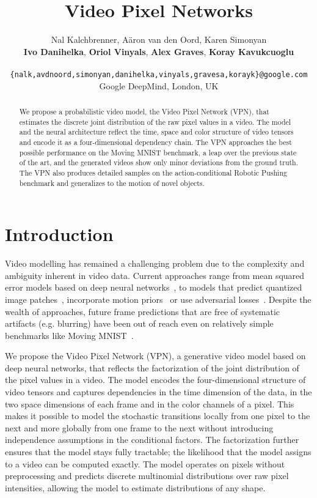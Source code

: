 \documentclass{article}
\title{Video Pixel Networks}
\author{
  {Nal Kalchbrenner},
  {A\"aron van den Oord},
  {Karen Simonyan} \vspace{0.08cm} \\ 
  \hspace{0.02cm} \textbf{Ivo Danihelka},
  \textbf{Oriol Vinyals},
  \textbf{Alex Graves},
  \textbf{Koray Kavukcuoglu} \\ \\ 
 \hspace{0.02cm} \texttt{\{nalk,avdnoord,simonyan,danihelka,vinyals,gravesa,korayk\}@google.com} \vspace{0.08cm}  \\
 \hspace{0.02cm} Google DeepMind, London, UK
}
\begin{document}
\maketitle

\begin{abstract}

We propose a probabilistic video model, the Video Pixel Network (VPN), that estimates the discrete joint distribution of the raw pixel values in a video. The model and the neural architecture reflect  the time, space and color structure of video tensors and encode it as a four-dimensional dependency chain. The VPN approaches the best possible performance on the Moving MNIST benchmark, a leap over the previous state of the art, and the generated videos show only minor deviations from the ground truth. The VPN also produces detailed samples on the action-conditional Robotic Pushing benchmark and generalizes to the motion of novel objects. 
\end{abstract}

\section{Introduction}

Video modelling has remained a challenging problem due to the complexity and ambiguity inherent in video data. Current approaches range from mean squared error models based on deep neural networks~\citep{ICML-2015-SrivastavaMS,DBLP:conf/nips/OhGLLS15}, to models that predict quantized image patches~\citep{DBLP:journals/corr/RanzatoSBMCC14}, incorporate motion priors~\citep{DBLP:journals/corr/PatrauceanHC15,DBLP:journals/corr/FinnGL16} or use adversarial losses~\citep{DBLP:journals/corr/MathieuCL15,scenedynamics}. Despite the wealth of approaches, future frame predictions that are free of systematic artifacts (e.g. blurring) have been out of reach even on relatively simple benchmarks like Moving MNIST~\citep{ICML-2015-SrivastavaMS}. 


We propose the Video Pixel Network (VPN), a generative video model based on deep neural networks, that reflects the factorization of the joint distribution of the pixel values in a video. The model encodes the four-dimensional structure of video tensors and captures dependencies in the time dimension of the data, in the two space dimensions of each frame and in the color channels of a pixel. 
This makes it possible to model the stochastic transitions locally from one pixel to the next and more globally from one frame to the next without introducing independence assumptions in the conditional factors. The factorization further ensures that the model stays fully tractable; the likelihood that the model assigns to a video can be computed exactly.  The model operates on pixels without preprocessing and predicts discrete multinomial distributions over raw pixel intensities, allowing the model to estimate distributions of any shape. 
\end{document}
